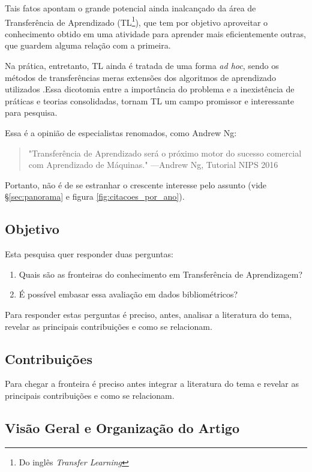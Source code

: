 \documentclass[sigconf]{acmart}
\begin{document}
  Tais fatos apontam  o grande potencial ainda inalcançado da área de Transferência de Aprendizado (TL\footnote{Do inglês \emph{Transfer Learning}}), que tem por objetivo aproveitar o conhecimento obtido em uma atividade para aprender mais eficientemente outras, que guardem alguma relação com a primeira.
  
  Na prática, entretanto, TL ainda é tratada de uma forma \textit{ad hoc}, sendo os métodos de transferências meras extensões dos algoritmos de aprendizado utilizados \cite{torrey}.Essa dicotomia entre a importância do problema e a inexistência de práticas e teorias consolidadas, tornam TL um campo promissor e interessante para pesquisa. 
  
  Essa é a opinião de especialistas renomados, como Andrew Ng:
  \begin{quote} "Transferência de Aprendizado será o próximo motor do sucesso comercial com Aprendizado de Máquinas." \hfill ---Andrew Ng, Tutorial NIPS 2016 \cite{ANg}
  \end{quote}

  Portanto, não é de se estranhar o crescente interesse pelo assunto (vide \S\ref{sec:panorama} e figura \ref{fig:citacoes_por_ano}).  

  \subsection{Objetivo}
   Esta pesquisa quer responder duas perguntas:
    \begin{enumerate}
      \item{Quais são as fronteiras do conhecimento em Transferência de Aprendizagem?}
      \item {É possível embasar essa avaliação em dados bibliométricos?}
    \end{enumerate}
    Para responder estas perguntas é preciso, antes, analisar a literatura do tema, revelar as principais contribuições e como se relacionam.
  
  \subsection{Contribuições}
    Para chegar a fronteira é preciso antes integrar a literatura do tema e revelar as principais contribuições e como se relacionam.
    \lipsum[3]
  
  \subsection{Visão Geral e Organização do Artigo}
  \lipsum[3]
\end{document}
